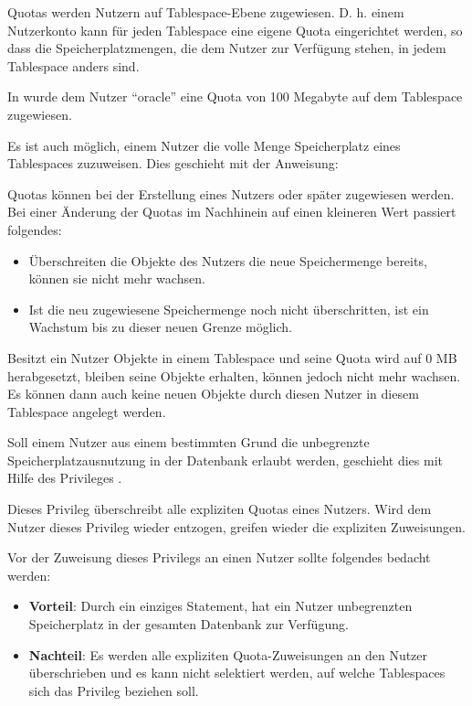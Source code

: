           Quotas werden Nutzern auf Tablespace-Ebene zugewiesen. D. h. einem Nutzerkonto kann für jeden Tablespace eine eigene Quota eingerichtet werden, so dass die Speicherplatzmengen, die dem Nutzer zur Verfügung stehen, in jedem Tablespace anders sind.

          In  wurde dem Nutzer \enquote{oracle} eine Quota von 100 Megabyte auf dem Tablespace  zugewiesen.
          \begin{merke}
            Es ist auch möglich, einem Nutzer die volle Menge Speicherplatz eines Tablespaces zuzuweisen. Dies geschieht mit der Anweisung: 
          \end{merke}
\clearpage
          Quotas können bei der Erstellung eines Nutzers oder später zugewiesen werden. Bei einer Änderung der Quotas im Nachhinein auf einen kleineren Wert passiert folgendes:
          \begin{itemize}
            \item Überschreiten die Objekte des Nutzers die neue Speichermenge bereits, können sie nicht mehr wachsen.
            \item Ist die neu zugewiesene Speichermenge noch nicht überschritten, ist ein Wachstum bis zu dieser neuen Grenze möglich.
          \end{itemize}
          Besitzt ein Nutzer Objekte in einem Tablespace und seine Quota wird auf 0 MB herabgesetzt, bleiben seine Objekte erhalten, können jedoch nicht mehr wachsen. Es können dann auch keine neuen Objekte durch diesen Nutzer in diesem Tablespace angelegt werden.

          Soll einem Nutzer aus einem bestimmten Grund die unbegrenzte Speicherplatzausnutzung in der Datenbank erlaubt werden, geschieht dies mit Hilfe des Privileges .
          \begin{merke}
            Dieses Privileg überschreibt alle expliziten Quotas eines Nutzers. Wird dem Nutzer dieses Privileg wieder entzogen, greifen wieder die expliziten Zuweisungen.
          \end{merke}
          Vor der Zuweisung dieses Privilegs an einen Nutzer sollte folgendes bedacht werden:
          \begin{itemize}
            \item \textbf{Vorteil}: Durch ein einziges Statement, hat ein Nutzer unbegrenzten Speicherplatz in der gesamten Datenbank zur Verfügung.
            \item \textbf{Nachteil}: Es werden alle expliziten  Quota-Zuweisungen an den Nutzer überschrieben und es kann nicht selektiert werden, auf welche Tablespaces sich das Privileg  beziehen soll.
          \end{itemize}

